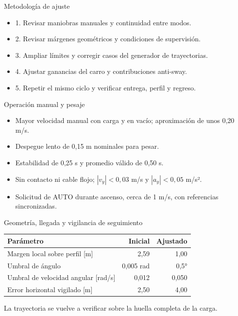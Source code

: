 \documentclass[aspectratio=169,11pt]{beamer}
\begin{document}
\begin{frame}[t,label=slide79]{Metodología de ajuste}
\begin{itemize}
\item 1. Revisar maniobras manuales y continuidad entre modos.
\item 2. Revisar márgenes geométricos y condiciones de supervisión.
\item 3. Ampliar límites y corregir casos del generador de trayectorias.
\item 4. Ajustar ganancias del carro y contribuciones anti-sway.
\item 5. Repetir el mismo ciclo y verificar entrega, perfil y regreso.
\end{itemize}
\end{frame}
\begin{frame}[t,label=slide80]{Operación manual y pesaje}
\begin{itemize}
\item Mayor velocidad manual con carga y en vacío; aproximación de unos 0,20 m/s.
\item Despegue lento de 0,15 m nominales para pesar.
\item Estabilidad de 0,25 s y promedio válido de 0,50 s.
\item Sin contacto ni cable flojo; $|v_y|<0,03$ m/s y $|a_y|<0,05$ m/s².
\item Solicitud de AUTO durante ascenso, cerca de 1 m/s, con referencias sincronizadas.
\end{itemize}
\end{frame}
\begin{frame}[t,label=slide81]{Geometría, llegada y vigilancia de seguimiento}
\begin{center}
{\small\renewcommand{\arraystretch}{1.0}
\begin{tabular}{lrr}\toprule
Parámetro & Inicial & Ajustado\\\midrule
Margen local sobre perfil [m] & 2,59 & 1,00\\
Umbral de ángulo & 0,005 rad & 0,5°\\
Umbral de velocidad angular [rad/s] & 0,012 & 0,050\\
Error horizontal vigilado [m] & 2,50 & 4,00\\
\bottomrule\end{tabular}}\end{center}
La trayectoria se vuelve a verificar sobre la huella completa de la carga.
\end{frame}
\end{document}
